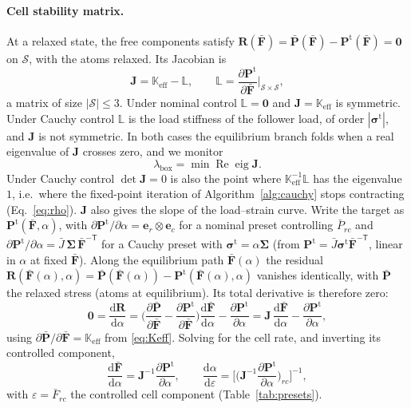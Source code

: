 \documentclass[11pt,a4paper]{article}
\newcommand{\Fb}{\bar{\mathbf F}}
\newcommand{\Pb}{\bar{\mathbf P}}
\newcommand{\Pt}{\mathbf P^{\mathrm t}}
\newcommand{\sigt}{\bm\sigma^{\mathrm t}}
\begin{document}
\paragraph{Cell stability matrix.}
At a relaxed state, the free components satisfy \(\mathbf R(\Fb)=\Pb(\Fb)-\Pt(\Fb)=\mathbf 0\) on
\(\mathcal S\), with the atoms relaxed. Its Jacobian is
\begin{equation}
  \mathbf J=\mathbb K_{\mathrm{eff}}-\mathbb L,\qquad
  \mathbb L=\frac{\partial\Pt}{\partial\Fb}\Big|_{\mathcal S\times\mathcal S},
  \label{eq:Jcell}
\end{equation}
a matrix of size \(|\mathcal S|\le3\). Under nominal control \(\mathbb L=\mathbf 0\) and
\(\mathbf J=\mathbb K_{\mathrm{eff}}\) is symmetric. Under Cauchy control \(\mathbb L\) is the load
stiffness of the follower load, of order \(|\sigt|\), and \(\mathbf J\) is not symmetric. In both cases
the equilibrium branch folds when a real eigenvalue of \(\mathbf J\) crosses zero, and we monitor
\begin{equation}
  \lambda_{\mathrm{box}}=\min\operatorname{Re}\operatorname{eig}\mathbf J .
  \label{eq:lambdabox}
\end{equation}
Under Cauchy control \(\det\mathbf J=0\) is also the point where \(\mathbb K_{\mathrm{eff}}^{-1}\mathbb L\)
has the eigenvalue \(1\), i.e.\ where the fixed-point iteration of Algorithm~\ref{alg:cauchy} stops
contracting (Eq.~\eqref{eq:rho}). \(\mathbf J\) also gives the slope of the load--strain curve. Write
the target as \(\Pt(\Fb,\alpha)\), with \(\partial\Pt/\partial\alpha=\mathbf e_r\otimes\mathbf e_c\) for a
nominal preset controlling \(\bar P_{rc}\) and \(\partial\Pt/\partial\alpha=\bar J\,\bm\Sigma\,\Fb^{-\mathsf T}\)
for a Cauchy preset with \(\sigt=\alpha\bm\Sigma\) (from \(\Pt=\bar J\sigt\Fb^{-\mathsf T}\), linear in
\(\alpha\) at fixed \(\Fb\)). Along the equilibrium path \(\Fb(\alpha)\) the residual
\(\mathbf R(\Fb(\alpha),\alpha)=\Pb(\Fb(\alpha))-\Pt(\Fb(\alpha),\alpha)\) vanishes identically, with
\(\Pb\) the relaxed stress (atoms at equilibrium). Its total derivative is therefore zero:
\[
  \mathbf 0=\frac{\mathrm d\mathbf R}{\mathrm d\alpha}
  =\Big(\frac{\partial\Pb}{\partial\Fb}-\frac{\partial\Pt}{\partial\Fb}\Big)\frac{\mathrm d\Fb}{\mathrm d\alpha}
   -\frac{\partial\Pt}{\partial\alpha}
  =\mathbf J\,\frac{\mathrm d\Fb}{\mathrm d\alpha}-\frac{\partial\Pt}{\partial\alpha},
\]
using \(\partial\Pb/\partial\Fb=\mathbb K_{\mathrm{eff}}\) from \eqref{eq:Keff}. Solving for the cell
rate, and inverting its controlled component,
\begin{equation}
  \frac{\mathrm d\Fb}{\mathrm d\alpha}=\mathbf J^{-1}\frac{\partial\Pt}{\partial\alpha},\qquad
  \frac{\mathrm d\alpha}{\mathrm d\varepsilon}=\Big[\Big(\mathbf J^{-1}\frac{\partial\Pt}{\partial\alpha}\Big)_{rc}\Big]^{-1},
  \label{eq:pathtangent}
\end{equation}
with \(\varepsilon=\bar F_{rc}\) the controlled cell component (Table~\ref{tab:presets}).
\end{document}
